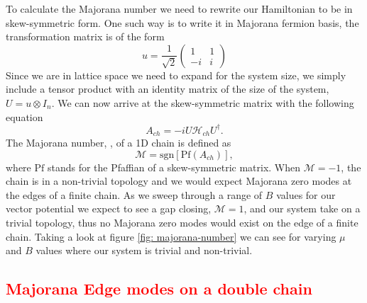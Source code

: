 \documentclass[aps,prb,showpacs,twocolumn,amsmath,amssymb,superscriptaddress]{revtex4-2}
\newcommand{\Red}[1]{\textcolor{red}{#1}}
\newcommand{\Ham}{\mathcal{H}}
\begin{document}
To calculate the Majorana number we need to rewrite our Hamiltonian to be in skew-symmetric form.
One such way is to write it in Majorana fermion basis, the transformation matrix is of the form
\[
  u = \dfrac{1}{\sqrt{2}} \left(
  \begin{matrix}
    1 & 1 \\
    -i & i
\end{matrix} \right)
\]
Since we are in lattice space we need to expand for the system size, we simply include a tensor product with an identity matrix of the size of the system, $U = u \otimes I_n$.
We can now arrive at the skew-symmetric matrix with the following equation
\begin{equation}
  A_{ch} = -i U \Ham_{ch} U^{\dagger}.
\end{equation}
The Majorana number, , of a 1D chain is defined as
\begin{equation}
  \mathcal{M} = \text{sgn}[\text{Pf}(A_{ch})],
\end{equation}
where $\text{Pf}$ stands for the Pfaffian of a skew-symmetric matrix.
When $\mathcal{M} = -1$, the chain is in a non-trivial topology and we would expect Majorana zero modes at the edges of a finite chain.
As we sweep through a range of $B$ values for our vector potential we expect to see a gap closing, $\mathcal{M} = 1$, and our system take on a trivial topology, thus no Majorana zero modes would exist on the edge of a finite chain.
Taking a look at figure \ref{fig: majorana-number} we can see for varying $\mu$ and $B$ values where our system is trivial and non-trivial.

\subsection{\Red{Majorana Edge modes on a double chain}}
\end{document}
